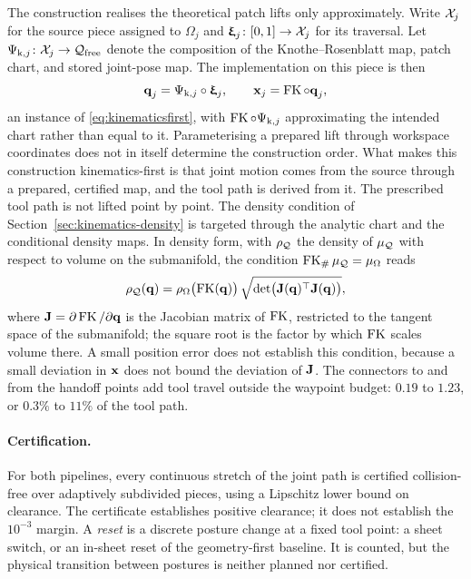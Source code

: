 The construction realises the theoretical patch lifts only approximately. Write $\mathcal{X}_j$ for the source piece assigned to $\Omega_j$ and ${\bm{\mathrm{\upxi}}}_j\colon[0,1]\to\mathcal{X}_j$ for its traversal. Let $\Psi_{\mathrm{k},j}\colon\mathcal{X}_j\to\mathcal{Q}_{\mathrm{free}}$ denote the composition of the Knothe--Rosenblatt map, patch chart, and stored joint-pose map. The implementation on this piece is then
\[
  {\bm{\mathrm{q}}}_j=\Psi_{\mathrm{k},j}\circ{\bm{\mathrm{\upxi}}}_j,\qquad {\bm{\mathrm{x}}}_j=\operatorname{FK}\circ {\bm{\mathrm{q}}}_j,
\]
an instance of \eqref{eq:kinematicsfirst}, with $\operatorname{FK}\circ\Psi_{\mathrm{k},j}$ approximating the intended chart rather than equal to it. Parameterising a prepared lift through workspace coordinates does not in itself determine the construction order. What makes this construction kinematics-first is that joint motion comes from the source through a prepared, certified map, and the tool path is derived from it. The prescribed tool path is not lifted point by point. The density condition of Section~\ref{sec:kinematics-density} is targeted through the analytic chart and the conditional density maps. In density form, with $\rho_{\mathcal{Q}}$ the density of $\mu_{\mathcal{Q}}$ with respect to volume on the submanifold, the condition $\operatorname{FK}_\#\mu_{\mathcal{Q}}=\mu_\Omega$ reads
\[
  \rho_{\mathcal{Q}}({\bm{\mathrm{q}}})=\rho_\Omega\bigl(\operatorname{FK}({\bm{\mathrm{q}}})\bigr)\,\sqrt{\det\bigl({\bm{\mathrm{J}}}({\bm{\mathrm{q}}})^\top{\bm{\mathrm{J}}}({\bm{\mathrm{q}}})\bigr)},
\]
where ${\bm{\mathrm{J}}}=\partial\operatorname{FK}/\partial{\bm{\mathrm{q}}}$ is the Jacobian matrix of $\operatorname{FK}$, restricted to the tangent space of the submanifold; the square root is the factor by which $\operatorname{FK}$ scales volume there. A small position error does not establish this condition, because a small deviation in ${\bm{\mathrm{x}}}$ does not bound the deviation of ${\bm{\mathrm{J}}}$. The connectors to and from the handoff points add tool travel outside the waypoint budget: $0.19$ to $1.23$, or $0.3\%$ to $11\%$ of the tool path.

\paragraph{Certification.}
For both pipelines, every continuous stretch of the joint path is certified collision-free over adaptively subdivided pieces, using a Lipschitz lower bound on clearance. The certificate establishes positive clearance; it does not establish the $10^{-3}$ margin. A \emph{reset} is a discrete posture change at a fixed tool point: a sheet switch, or an in-sheet reset of the geometry-first baseline. It is counted, but the physical transition between postures is neither planned nor certified.

